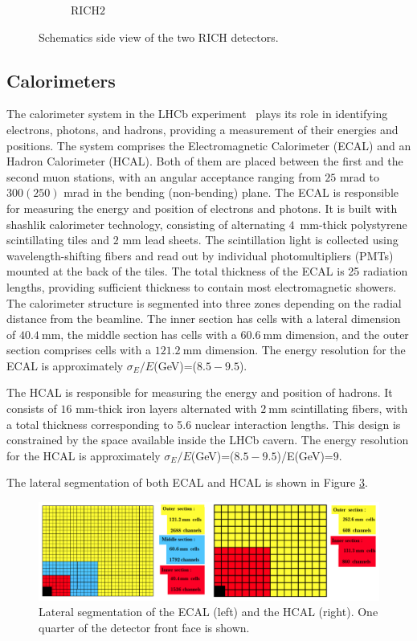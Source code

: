 \begin{figure}
\begin{subfigure}{0.48\textwidth}
    \caption{RICH$2$}\label{rich2}
    \end{subfigure}
    \caption{Schematics side view of the two RICH detectors.}
    \label{fig:rich}
\end{figure}

\subsection{Calorimeters}
\sloppy
The calorimeter system in the LHCb experiment~\cite{LHCb:2000vji} plays its role in identifying electrons, photons, and hadrons, providing a measurement of their energies and positions. The system comprises the Electromagnetic Calorimeter (ECAL) and an  Hadron Calorimeter (HCAL). Both of them are  placed between the first and the second muon stations, with an angular acceptance ranging from $25$ mrad to $300(250)$ mrad in the bending (non-bending) plane. 
The ECAL is responsible for measuring the energy and position of electrons and photons. It is built with shashlik calorimeter technology, consisting of alternating $4$~mm-thick polystyrene scintillating tiles and $2$ mm lead sheets. The scintillation light is collected using wavelength-shifting fibers and read out by individual photomultipliers (PMTs) mounted at the back of the tiles. The total thickness of the ECAL is 25 radiation lengths, providing sufficient thickness to contain most electromagnetic showers. The calorimeter structure is segmented into three zones depending on the radial distance from the beamline. The inner section has cells with a lateral dimension of $\SI{40.4}{\milli\meter}$, the middle section has cells with a $\SI{60.6}{\milli\meter}$ dimension, and the outer section comprises cells with a $\SI{121.2}{\milli\meter}$ dimension. The energy resolution for the ECAL is approximately 
 $\sigma_E/E$(GeV)=($8.5-9.5$).

\sloppy
The HCAL is responsible for measuring the energy and position of hadrons. It consists of $16$ mm-thick iron layers alternated with $\SI{2}{\milli\meter}$ scintillating fibers, with a total thickness corresponding to 5.6 nuclear interaction lengths. This design is constrained by the space available inside the LHCb cavern. The energy resolution for the HCAL is approximately $\sigma_E/E$(GeV)=($8.5-9.5$)/E(GeV)=$9$.

The lateral segmentation of both ECAL and HCAL is shown in Figure \ref{fig:cal_system}.
\begin{figure}
    \centering
    \includegraphics[width=\textwidth]{figures/CAL_system.png}
    \caption{Lateral segmentation of the ECAL (left) and the HCAL (right). One quarter of the detector front face is shown.}
    \label{fig:cal_system}
\end{figure}
